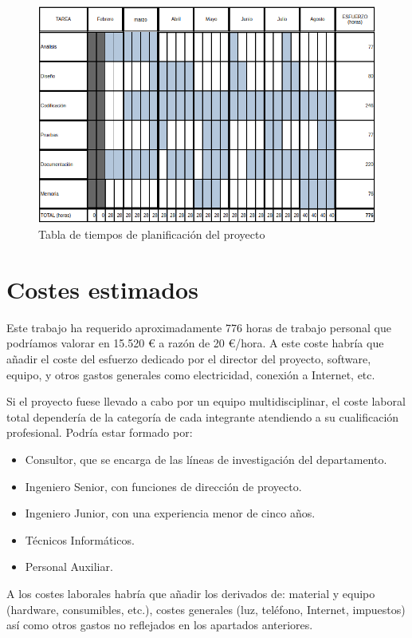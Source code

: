 \begin{figure}[H]
  \centering
  \includegraphics[width=\textwidth]{imaxes/planificacion.png}
  \caption{Tabla de tiempos de planificación del proyecto}
  \label{fig:planificacion}
\end{figure}


\section {Costes estimados}

Este trabajo ha requerido aproximadamente 776 horas de trabajo personal que
podríamos valorar en 15.520 € a razón de 20 €/hora. A este coste habría que añadir el coste del esfuerzo dedicado por el director del proyecto, software, equipo, y otros gastos generales como electricidad, conexión a Internet, etc.

Si el proyecto fuese llevado a cabo por un equipo multidisciplinar, el coste laboral total dependería de la categoría de cada integrante atendiendo a su cualificación profesional. Podría estar formado por:
\begin{itemize}
\item Consultor, que se encarga de las líneas de investigación del
departamento.
\item Ingeniero Senior, con funciones de dirección de proyecto.
\item Ingeniero Junior, con una experiencia menor de cinco años.
\item Técnicos Informáticos.
\item Personal Auxiliar.
\end{itemize}

A los costes laborales habría que añadir los derivados de: material y equipo (hardware, consumibles, etc.), costes generales (luz, teléfono, Internet, impuestos) así como otros gastos no reflejados en los apartados anteriores.

